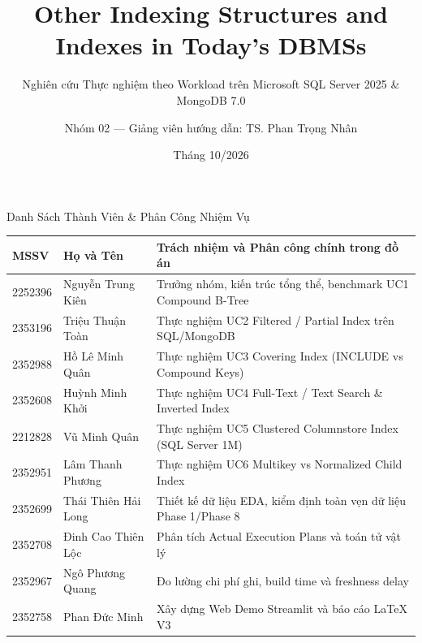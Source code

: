 \documentclass[aspectratio=169,9pt]{beamer}
\title[Other Indexing Structures]{\textbf{Other Indexing Structures and Indexes in Today's DBMSs}}
\subtitle{Nghiên cứu Thực nghiệm theo Workload trên Microsoft SQL Server 2025 \& MongoDB 7.0}
\author[Nhóm 02]{Nhóm 02 --- Giảng viên hướng dẫn: TS. Phan Trọng Nhân}
\institute[HCMUT]{Trường Đại học Bách khoa TP.HCM --- Khoa Khoa học \& Kỹ thuật Máy tính}
\date{Tháng 10/2026}
\begin{document}
\begin{frame}
  \titlepage
\end{frame}

\begin{frame}{Danh Sách Thành Viên \& Phân Công Nhiệm Vụ}
\begin{table}
\centering\footnotesize
\begin{tabularx}{\linewidth}{@{}l l X@{}}
\toprule
\textbf{MSSV} & \textbf{Họ và Tên} & \textbf{Trách nhiệm và Phân công chính trong đồ án} \\
\midrule
2252396 & Nguyễn Trung Kiên & Trưởng nhóm, kiến trúc tổng thể, benchmark UC1 Compound B-Tree \\
2353196 & Triệu Thuận Toàn & Thực nghiệm UC2 Filtered / Partial Index trên SQL/MongoDB \\
2352988 & Hồ Lê Minh Quân & Thực nghiệm UC3 Covering Index (INCLUDE vs Compound Keys) \\
2352608 & Huỳnh Minh Khởi & Thực nghiệm UC4 Full-Text / Text Search \& Inverted Index \\
2212828 & Vũ Minh Quân & Thực nghiệm UC5 Clustered Columnstore Index (SQL Server 1M) \\
2352951 & Lâm Thanh Phương & Thực nghiệm UC6 Multikey vs Normalized Child Index \\
2352699 & Thái Thiên Hải Long & Thiết kế dữ liệu EDA, kiểm định toàn vẹn dữ liệu Phase 1/Phase 8 \\
2352708 & Đinh Cao Thiên Lộc & Phân tích Actual Execution Plans và toán tử vật lý \\
2352967 & Ngô Phương Quang & Đo lường chi phí ghi, build time và freshness delay \\
2352758 & Phan Đức Minh & Xây dựng Web Demo Streamlit và báo cáo LaTeX V3 \\
\bottomrule
\end{tabularx}
\end{table}
\end{frame}
\end{document}
